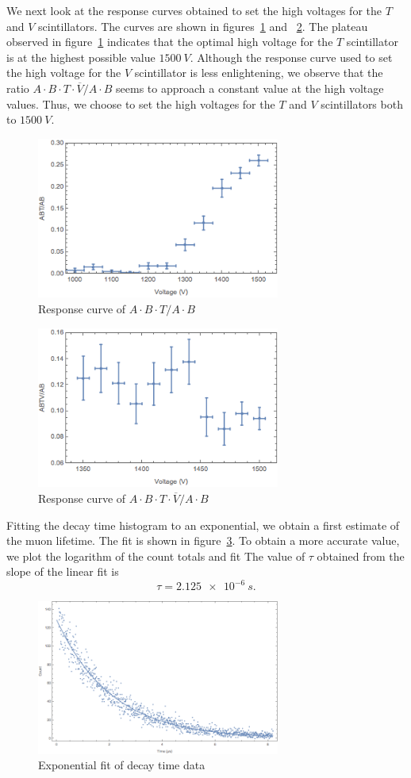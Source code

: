 \documentclass[aps, reprint,amsmath,amssymb]{revtex4-1} %
\begin{document}
We next look at the response curves obtained to set the high voltages for the $T$ and $V$ scintillators. The curves are shown in figures~\ref{fig:ABT} and ~\ref{fig:ABTV}. The plateau observed in figure~\ref{fig:ABT} indicates that the optimal high voltage for the $T$ scintillator is at the highest possible value $\SI{1500}{V}$. Although the response curve used to set the high voltage for the $V$ scintillator is less enlightening, we observe that the ratio $A\cdot B\cdot T \cdot \overline{V}/ A\cdot B$ seems to approach a constant value at the high voltage values. Thus, we choose to set the high voltages for the $T$ and $V$ scintillators both to $\SI{1500}{V}$.

\begin{figure}
\centering
\includegraphics[width=8cm]{ABT.png}
\caption{Response curve of $A\cdot B\cdot T/ A\cdot B$}
\label{fig:ABT}
\end{figure}
\begin{figure}
\centering
\includegraphics[width=8cm]{ABTV.png}
\caption{Response curve of $A\cdot B\cdot T \cdot \overline{V}/ A\cdot B$}
\label{fig:ABTV}
\end{figure}

Fitting the decay time histogram to an exponential, we obtain a first estimate of the muon lifetime. The fit is shown in figure~\ref{fig:fit}. To obtain a more accurate value, we plot the logarithm of the count totals and fit  The value of $\tau$ obtained from the slope of the linear fit is
\[
	\tau = \SI{2.125e-6}{s}.
\]
\begin{figure}
\centering
\includegraphics[width=8cm]{fit.png}
\caption{Exponential fit of decay time data}
\label{fig:fit}
\end{figure}
\end{document}
